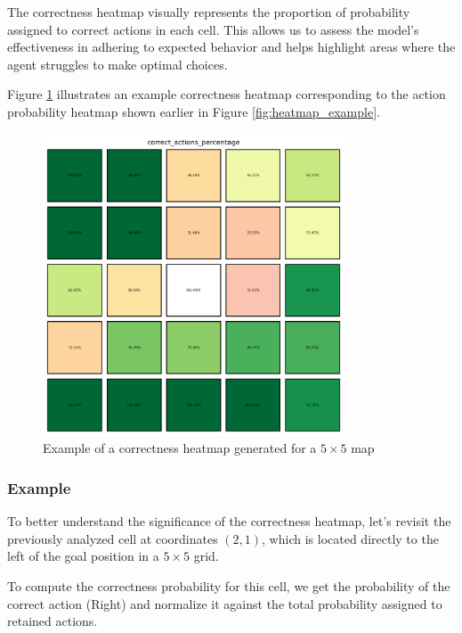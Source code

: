 The correctness heatmap visually represents the proportion of probability assigned
to correct actions in each cell. This allows us to assess the model's
effectiveness in adhering to expected behavior and helps highlight areas where
the agent struggles to make optimal choices.

Figure \ref{fig:correctness_example} illustrates an example correctness heatmap
corresponding to the action probability heatmap shown earlier in Figure
\ref{fig:heatmap_example}.

\begin{figure}[ht!]
  \centering
  \includegraphics[width=0.8\textwidth]{
    images/data_collection/correctness_example.png
  }
  \caption{Example of a correctness heatmap generated for a $5 \times 5$ map}
  \label{fig:correctness_example}
\end{figure}

\subsubsection{Example}

To better understand the significance of the correctness heatmap, let's revisit the
previously analyzed cell at coordinates $(2,1)$, which is located directly to
the left of the goal position in a $5 \times 5$ grid.

To compute the correctness probability for this cell, we get the probability of the
correct action (Right) and normalize it against the total probability assigned to
retained actions.

